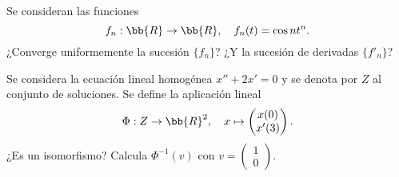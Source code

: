 \documentclass[12pt]{article}
\begin{document}
    \begin{ejercicio}
        Se consideran las funciones
        \[
            f_n : \bb{R} \to \bb{R}, \quad f_n(t) = \cos nt^n.
        \]
        ¿Converge uniformemente la sucesión $\{f_n\}$? ¿Y la sucesión de derivadas $\{f'_n\}$?
    \end{ejercicio}

    \begin{ejercicio}
        Se considera la ecuación lineal homogénea $x'' + 2x' = 0$ y se denota por $Z$ al conjunto de soluciones. Se define la aplicación lineal
        \[
            \Phi : Z \to \bb{R}^2, \quad x \mapsto \begin{pmatrix}
                x(0) \\ x'(3)
            \end{pmatrix}.
        \]
        ¿Es un isomorfismo? Calcula $\Phi^{-1}(v)$ con $v = \begin{pmatrix}
            1 \\ 0
        \end{pmatrix}$.
    \end{ejercicio}
\end{document}
